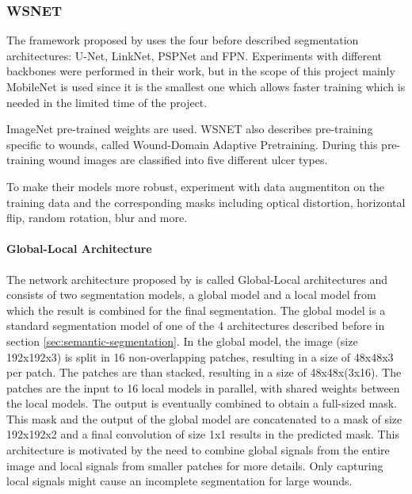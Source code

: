 \subsubsection{WSNET}

The framework proposed by \citeauthor{Oota_2023_WACV} uses the four before described segmentation architectures: U-Net, LinkNet, PSPNet and FPN. Experiments with different backbones were performed in their work, but in the scope of this project mainly MobileNet \cite{howard2017mobilenets} is used since it is the smallest one which allows faster training which is needed in the limited time of the project.

ImageNet pre-trained weights are used. WSNET also describes pre-training specific to wounds, called Wound-Domain Adaptive Pretraining. During this pre-training wound images are classified into five different ulcer types.

To make their models more robust, \citeauthor{Oota_2023_WACV} experiment with data augmentiton on the training data and the corresponding masks including optical distortion, horizontal flip, random rotation, blur and more.

\paragraph{Global-Local Architecture}

The network architecture proposed by \citeauthor{Oota_2023_WACV} is called Global-Local architectures and consists of two segmentation models, a global model and a local model from which the result is combined for the final segmentation. The global model is a standard segmentation model of one of the 4 architectures described before in section \ref{sec:semantic-segmentation}. In the global model, the image (size 192x192x3) is split in 16 non-overlapping patches, resulting in a size of 48x48x3 per patch. The patches are than stacked, resulting in a size of 48x48x(3x16). The patches are the input to 16 local models in parallel, with shared weights between the local models. The output is eventually combined to obtain a full-sized mask. This mask and the output of the global model are concatenated to a mask of size 192x192x2 and a final convolution of size 1x1 results in the predicted mask. This architecture is motivated by the need to combine global signals from the entire image and local signals from smaller patches for more details. Only capturing local signals might cause an incomplete segmentation for large wounds. \cite{Oota_2023_WACV} %

